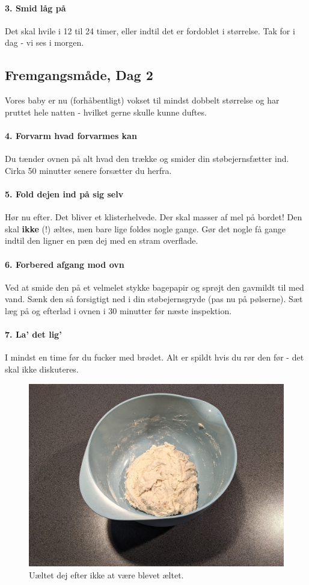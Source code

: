 \paragraph*{3. Smid låg på}
Det skal hvile i 12 til 24 timer, eller indtil det er fordoblet i størrelse. Tak for i dag - vi ses i morgen.

\subsection{Fremgangsmåde, Dag 2}
Vores baby er nu (forhåbentligt) vokset til mindst dobbelt størrelse og har pruttet hele natten - hvilket gerne skulle kunne duftes.

\paragraph*{4. Forvarm hvad forvarmes kan}
Du tænder ovnen på alt hvad den trække og smider din støbejernsfætter ind. Cirka 50 minutter senere forsætter du herfra.

\paragraph*{5. Fold dejen ind på sig selv}
Hør nu efter. Det bliver et klisterhelvede. Der skal masser af mel på bordet! Den skal \textbf{ikke} (!) æltes, men bare lige foldes nogle gange. Gør det nogle få gange indtil den ligner en pæn dej med en stram overflade.

\paragraph*{6. Forbered afgang mod ovn}
Ved at smide den på et velmelet stykke bagepapir og sprøjt den gavmildt til med vand. Sænk den så forsigtigt ned i din støbejernsgryde (pas nu på pølserne). Sæt læg på og efterlad i ovnen i 30 minutter før næste inspektion.

\paragraph*{7. La' det lig'}
I mindst en time før du fucker med brødet. Alt er spildt hvis du rør den før - det skal ikke diskuteres.

\begin{figure}[h]
	\centering
	\includegraphics[width=\linewidth]{figs/no-knead-bread-after-not-kneading}
	\caption{Uæltet dej efter ikke at være blevet æltet.}
	\label{fig:no-knead-bread-after-not-kneading}
\end{figure}
